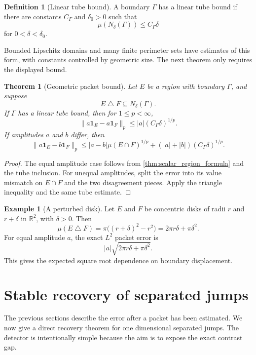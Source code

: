 \documentclass{aomart}
\newtheorem{theorem}{Theorem}[section]
\theoremstyle{definition}
\newtheorem{definition}[definition]{Definition}
\newtheorem{example}[example]{Example}
\theoremstyle{remark}
\newcommand{\RR}{\mathbb R}
\newcommand{\one}{\mathbf 1}
\begin{document}
\begin{definition}[Linear tube bound]\label{def:linear_tube_bound}
A boundary \(\Gamma\) has a linear tube bound if there are constants \(C_\Gamma\) and \(\delta_0>0\) such that
\[
\mu(N_\delta(\Gamma))
\leq
C_\Gamma\delta
\]
for \(0<\delta<\delta_0\).
\end{definition}

Bounded Lipschitz domains and many finite perimeter sets have estimates of this form, with constants controlled by geometric size. The next theorem only requires the displayed bound.

\begin{theorem}[Geometric packet bound]\label{thm:geometric_packet_bound}
Let \(E\) be a region with boundary \(\Gamma\), and suppose
\[
E\mathbin\triangle F
\subseteq
N_\delta(\Gamma).
\]
If \(\Gamma\) has a linear tube bound, then for \(1\leq p<\infty\),
\[
\|a\one_E-a\one_F\|_p
\leq
|a|(C_\Gamma\delta)^{1/p}.
\]
If amplitudes \(a\) and \(b\) differ, then
\[
\|a\one_E-b\one_F\|_p
\leq
|a-b|\mu(E\cap F)^{1/p}
+
(|a|+|b|)(C_\Gamma\delta)^{1/p}.
\]
\end{theorem}

\begin{proof}
The equal amplitude case follows from \cref{thm:scalar_region_formula} and the tube inclusion. For unequal amplitudes, split the error into its value mismatch on \(E\cap F\) and the two disagreement pieces. Apply the triangle inequality and the same tube estimate.
\end{proof}

\begin{example}[A perturbed disk]\label{ex:perturbed_disk}
Let \(E\) and \(F\) be concentric disks of radii \(r\) and \(r+\delta\) in \(\RR^2\), with \(\delta>0\). Then
\[
\mu(E\mathbin\triangle F)
=
\pi\bigl((r+\delta)^2-r^2\bigr)
=
2\pi r\delta+\pi\delta^2.
\]
For equal amplitude \(a\), the exact \(L^2\) packet error is
\[
|a|\sqrt{2\pi r\delta+\pi\delta^2}.
\]
This gives the expected square root dependence on boundary displacement.
\end{example}

\section{Stable recovery of separated jumps}\label{sec:jump_recovery}

The previous sections describe the error after a packet has been estimated. We now give a direct recovery theorem for one dimensional separated jumps. The detector is intentionally simple because the aim is to expose the exact contrast gap.
\end{document}
